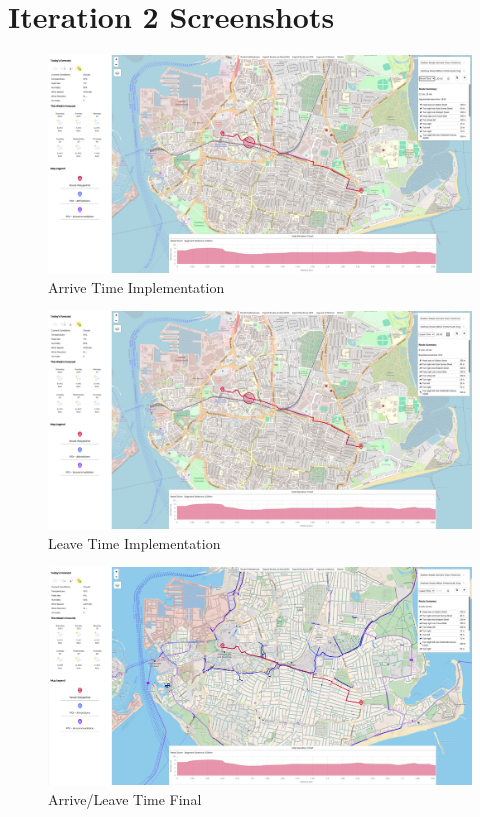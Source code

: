 \chapter{Iteration 2 Screenshots}

\begin{figure}[!ht]
    \centering
    \includegraphics[width=425px]{figures/Progress Images/Iteration-2/SR9-10/SR9 - Arrive Time.png}
    \caption{Arrive Time Implementation}
    \label{fig:arrive-time}
\end{figure}

\begin{figure}[!ht]
    \centering
    \includegraphics[width=425px]{figures/Progress Images/Iteration-2/SR9-10/SR9 - Leave Time.png}
    \caption{Leave Time Implementation}
    \label{fig:leave-time}
\end{figure}

\begin{figure}[!ht]
    \centering
    \includegraphics[width=425px]{figures/Progress Images/Iteration-2/SR9-10/SR9_10 - Leave_Arrival Time.png}
    \caption{Arrive/Leave Time Final}
    \label{fig:arrive-leave-time}
\end{figure}

